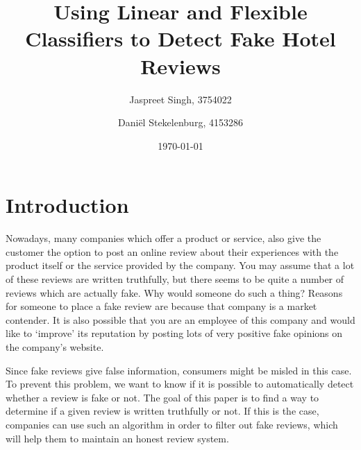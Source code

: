 \documentclass[a4paper,11pt]{article}
\begin{document}
\title{Using Linear and Flexible Classifiers to Detect Fake Hotel Reviews}
\date{\today}
\author{Jaspreet Singh, 3754022         	\and
        Dani\"el Stekelenburg, 4153286		
}
 
\maketitle


\section{Introduction}
Nowadays, many companies which offer a product or service, also give the customer the option to post an online review about their experiences with the product itself or the service provided by the company. You may assume that a lot of these reviews are written truthfully, but there seems to be quite a number of reviews which are actually fake. Why would someone do such a thing? Reasons for someone to place a fake review are because that company is a market contender. It is also possible that you are an employee of this company and would like to `improve' its reputation by posting lots of very positive fake opinions on the company's website. %

Since fake reviews give false information, consumers might be misled in this case. To prevent this problem, we want to know if it is possible to automatically detect whether a review is fake or not. The goal of this paper is to find a way to determine if a given review is written truthfully or not. If this is the case, companies can use such an algorithm in order to filter out fake reviews, which will help them to maintain an honest review system. %
\end{document}
